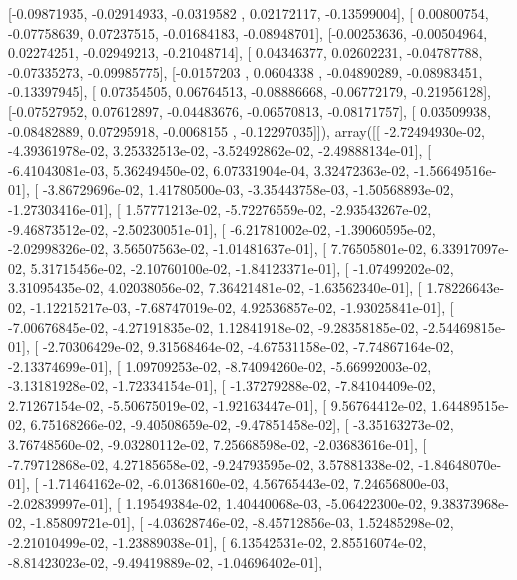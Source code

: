 \documentclass{article}
\begin{document}
       [-0.09871935, -0.02914933, -0.0319582 ,  0.02172117, -0.13599004],
       [ 0.00800754, -0.07758639,  0.07237515, -0.01684183, -0.08948701],
       [-0.00253636, -0.00504964,  0.02274251, -0.02949213, -0.21048714],
       [ 0.04346377,  0.02602231, -0.04787788, -0.07335273, -0.09985775],
       [-0.0157203 ,  0.0604338 , -0.04890289, -0.08983451, -0.13397945],
       [ 0.07354505,  0.06764513, -0.08886668, -0.06772179, -0.21956128],
       [-0.07527952,  0.07612897, -0.04483676, -0.06570813, -0.08171757],
       [ 0.03509938, -0.08482889,  0.07295918, -0.0068155 , -0.12297035]]), array([[ -2.72494930e-02,  -4.39361978e-02,   3.25332513e-02,
         -3.52492862e-02,  -2.49888134e-01],
       [ -6.41043081e-03,   5.36249450e-02,   6.07331904e-04,
          3.32472363e-02,  -1.56649516e-01],
       [ -3.86729696e-02,   1.41780500e-03,  -3.35443758e-03,
         -1.50568893e-02,  -1.27303416e-01],
       [  1.57771213e-02,  -5.72276559e-02,  -2.93543267e-02,
         -9.46873512e-02,  -2.50230051e-01],
       [ -6.21781002e-02,  -1.39060595e-02,  -2.02998326e-02,
          3.56507563e-02,  -1.01481637e-01],
       [  7.76505801e-02,   6.33917097e-02,   5.31715456e-02,
         -2.10760100e-02,  -1.84123371e-01],
       [ -1.07499202e-02,   3.31095435e-02,   4.02038056e-02,
          7.36421481e-02,  -1.63562340e-01],
       [  1.78226643e-02,  -1.12215217e-03,  -7.68747019e-02,
          4.92536857e-02,  -1.93025841e-01],
       [ -7.00676845e-02,  -4.27191835e-02,   1.12841918e-02,
         -9.28358185e-02,  -2.54469815e-01],
       [ -2.70306429e-02,   9.31568464e-02,  -4.67531158e-02,
         -7.74867164e-02,  -2.13374699e-01],
       [  1.09709253e-02,  -8.74094260e-02,  -5.66992003e-02,
         -3.13181928e-02,  -1.72334154e-01],
       [ -1.37279288e-02,  -7.84104409e-02,   2.71267154e-02,
         -5.50675019e-02,  -1.92163447e-01],
       [  9.56764412e-02,   1.64489515e-02,   6.75168266e-02,
         -9.40508659e-02,  -9.47851458e-02],
       [ -3.35163273e-02,   3.76748560e-02,  -9.03280112e-02,
          7.25668598e-02,  -2.03683616e-01],
       [ -7.79712868e-02,   4.27185658e-02,  -9.24793595e-02,
          3.57881338e-02,  -1.84648070e-01],
       [ -1.71464162e-02,  -6.01368160e-02,   4.56765443e-02,
          7.24656800e-03,  -2.02839997e-01],
       [  1.19549384e-02,   1.40440068e-03,  -5.06422300e-02,
          9.38373968e-02,  -1.85809721e-01],
       [ -4.03628746e-02,  -8.45712856e-03,   1.52485298e-02,
         -2.21010499e-02,  -1.23889038e-01],
       [  6.13542531e-02,   2.85516074e-02,  -8.81423023e-02,
         -9.49419889e-02,  -1.04696402e-01],
\end{document}
